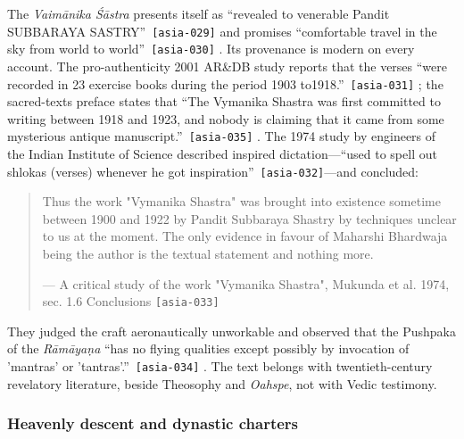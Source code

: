 \documentclass[11pt,a4paper]{article}
\newcommand{\pid}[1]{\texttt{\small #1}}
\begin{document}
The \emph{Vaimānika Śāstra} presents itself as \enquote{revealed to venerable Pandit SUBBARAYA SASTRY}~\pid{[asia-029]} and promises \enquote{comfortable travel in the sky from world to world}~\pid{[asia-030]} \parencite{josyer1973vymanika}. Its provenance is modern on every account. The pro-authenticity 2001 AR\&DB study reports that the verses \enquote{were recorded in 23 exercise books during the period 1903 to1918.}~\pid{[asia-031]} \parencite{rao2001vymanika}; the sacred-texts preface states that \enquote{The Vymanika Shastra was first committed to writing between 1918 and 1923, and nobody is claiming that it came from some mysterious antique manuscript.}~\pid{[asia-035]} \parencite{hare_vs_preface}. The 1974 study by engineers of the Indian Institute of Science described inspired dictation---\enquote{used to spell out shlokas (verses) whenever he got inspiration}~\pid{[asia-032]}---and concluded: 
\begin{quote}\small Thus the work "Vymanika Shastra" was brought into existence sometime between 1900 and 1922 by Pandit Subbaraya Shastry by techniques unclear to us at the moment. The only evidence in favour of Maharshi Bhardwaja being the author is the textual statement and nothing more.\par\hfill{\footnotesize --- A critical study of the work "Vymanika Shastra", Mukunda et al. 1974, sec. 1.6 Conclusions \pid{[asia-033]}}\end{quote}
 They judged the craft aeronautically unworkable and observed that the Pushpaka of the \emph{Rāmāyaṇa} \enquote{has no flying qualities except possibly by invocation of 'mantras' or 'tantras'.}~\pid{[asia-034]} \parencite{mukunda1974critical}. The text belongs with twentieth-century revelatory literature, beside Theosophy and \emph{Oahspe}, not with Vedic testimony.

\subsubsection{Heavenly descent and dynastic charters}
\end{document}
